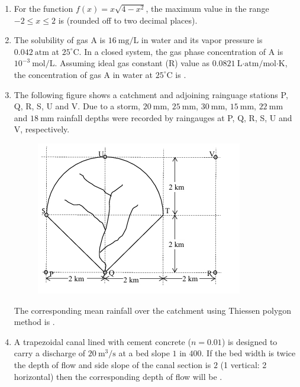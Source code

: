 \documentclass[journal,12pt,onecolumn]{IEEEtran}
\theoremstyle{remark}
\begin{document}
\begin{enumerate}
\item For the function $f(x) = x\sqrt{4 - x^2}$, the maximum value in the range $-2 \leq x \leq 2$ is \underline{\hspace{2cm}} (rounded off to two decimal places). \hfill{}

\item The solubility of gas A is $16\ \text{mg/L}$ in water and its vapor pressure is $0.042\ \text{atm}$ at $25^\circ$C. In a closed system, the gas phase concentration of A is $10^{-3}\ \text{mol/L}$. Assuming ideal gas constant (R) value as $0.0821\ \text{L·atm/mol·K}$, the concentration of gas A in water at $25^\circ$C is \underline{\hspace{2cm}} . \hfill{}

\newpage

\item The following figure  shows a catchment  and adjoining rainguage stations P, Q, R, S, U and V. Due to a storm, $20\ \text{mm}$, $25\ \text{mm}$, $30\ \text{mm}$, $15\ \text{mm}$, $22\ \text{mm}$ and $18\ \text{mm}$ rainfall depths were recorded by raingauges at P, Q, R, S, U and V, respectively.
\begin{center}
\begin{figure}[h]
    \centering
    \includegraphics[width=0.5\columnwidth]{figs/img 4.jpeg}
    \caption{}
    \label{fig:placeholder}
\end{figure}
\end{center}

The corresponding mean rainfall over the catchment using Thiessen polygon method is \underline{\hspace{2cm}} . \hfill{}

\item A trapezoidal canal lined with cement concrete ($n = 0.01$) is designed to carry a discharge of $20\ \text{m}^3/\text{s}$ at a bed slope $1$ in $400$. If the bed width is twice the depth of flow and side slope of the canal section is $2$ (1 vertical: 2 horizontal) then the corresponding depth of flow will be \underline{\hspace{2cm}} . \hfill{}


\end{enumerate}
\end{document}
